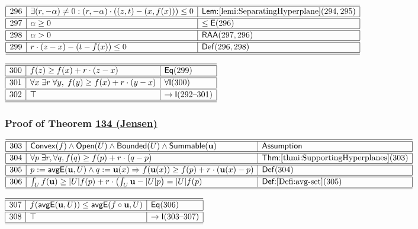 \documentclass[11pt,reqno]{amsart}
\begin{document}
\medskip

\noindent$%
\begin{array}{|r|l|l|}
\hline\hline
296 & \exists(r,-\alpha)\neq0:(r,-\alpha)\cdot((z,t)-(x,f(x)))\le0 & \textsf{Lem:}\ref{lemi:SeparatingHyperplane}(294,295) \\ \hline\hline
297 & \alpha\ge0 & \le\mathsf{E}(296) \\ \hline\hline
298 & \alpha>0 & \mathsf{RAA}(297,296) \\ \hline\hline
299 & r\cdot(z-x)-(t-f(x))\le0 & \mathsf{Def}(296,298) \\ \hline\hline
\end{array}%
$

\medskip

\noindent$%
\begin{array}{|r|l|l|}
\hline\hline
300 & f(z)\ge f(x)+r\cdot(z-x) & \mathsf{Eq}(299) \\ \hline\hline
301 & \forall x\;\exists r\;\forall y,\;f(y)\ge f(x)+r\cdot(y-x) & \forall\mathsf{I}(300) \\ \hline\hline
302 & \top & \to\mathsf{I}(292\text{--}301) \\ \hline\hline
\end{array}%
$

\medskip

\subsubsection*{Proof of Theorem \hyperlink{thm:Jensen}{134 (\textsf{Jensen})}}

\noindent$%
\begin{array}{|r|l|l|}
\hline\hline
303 & \mathsf{Convex}(f)\wedge\mathsf{Open}(U)\wedge\mathsf{Bounded}(U)\wedge\mathsf{Summable}(\mathbf{u}) & \textsf{Assumption} \\ \hline\hline
304 & \forall p\;\exists r,\forall q,f(q)\ge f(p)+r\cdot(q-p) & \textsf{Thm:}\ref{thmi:SupportingHyperplanes}(303) \\ \hline\hline
305 & p:=\mathsf{avgE}(\mathbf{u},U)\wedge q:=\mathbf{u}(x)\Rightarrow f(\mathbf{u}(x))\ge f(p)+r\cdot(\mathbf{u}(x)-p) & \mathsf{Def}(304) \\ \hline\hline
306 & \int_{U}f(\mathbf{u})\ge|U|f(p)+r\cdot\bigl(\int_{U}\mathbf{u}-|U|p\bigr)=|U|f(p) & \textsf{Def:}\ref{Defi:avg-set}(305) \\ \hline\hline
\end{array}%
$

\medskip

\noindent$%
\begin{array}{|r|l|l|}
\hline\hline
307 & f(\mathsf{avgE}(\mathbf{u},U))\le\mathsf{avgE}(f\circ\mathbf{u},U) & \mathsf{Eq}(306) \\ \hline\hline
308 & \top & \to\mathsf{I}(303\text{--}307) \\ \hline\hline
\end{array}%
$
\end{document}
